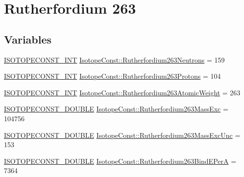 \hypertarget{group___isotope_const-_rutherfordium-_rf263}{}\section{Rutherfordium 263}
\label{group___isotope_const-_rutherfordium-_rf263}
\subsection*{Variables}
\begin{DoxyCompactItemize}
\item 
\mbox{\hyperlink{group___isotope_const-_macros_ga5f18360b3e99483a35c32d789e62621c}{I\+S\+O\+T\+O\+P\+E\+C\+O\+N\+S\+T\+\_\+\+I\+NT}} \mbox{\hyperlink{group___isotope_const-_rutherfordium-_rf263_ga49b1b76a16f8b190397a4f9443e6d981}{Isotope\+Const\+::\+Rutherfordium263\+Neutrons}} = 159
\item 
\mbox{\hyperlink{group___isotope_const-_macros_ga5f18360b3e99483a35c32d789e62621c}{I\+S\+O\+T\+O\+P\+E\+C\+O\+N\+S\+T\+\_\+\+I\+NT}} \mbox{\hyperlink{group___isotope_const-_rutherfordium-_rf263_gaeb50ead4712e514768cff008aa7c628b}{Isotope\+Const\+::\+Rutherfordium263\+Protons}} = 104
\item 
\mbox{\hyperlink{group___isotope_const-_macros_ga5f18360b3e99483a35c32d789e62621c}{I\+S\+O\+T\+O\+P\+E\+C\+O\+N\+S\+T\+\_\+\+I\+NT}} \mbox{\hyperlink{group___isotope_const-_rutherfordium-_rf263_gae3bc559599657714de6118653ead2b63}{Isotope\+Const\+::\+Rutherfordium263\+Atomic\+Weight}} = 263
\item 
\mbox{\hyperlink{group___isotope_const-_macros_ga8f45a7272ce02c0b4c65c44636ed719a}{I\+S\+O\+T\+O\+P\+E\+C\+O\+N\+S\+T\+\_\+\+D\+O\+U\+B\+LE}} \mbox{\hyperlink{group___isotope_const-_rutherfordium-_rf263_ga4adbe609a2bbd912a152fd78ff68497e}{Isotope\+Const\+::\+Rutherfordium263\+Mass\+Exc}} = 104756
\item 
\mbox{\hyperlink{group___isotope_const-_macros_ga8f45a7272ce02c0b4c65c44636ed719a}{I\+S\+O\+T\+O\+P\+E\+C\+O\+N\+S\+T\+\_\+\+D\+O\+U\+B\+LE}} \mbox{\hyperlink{group___isotope_const-_rutherfordium-_rf263_gae8f557850ffc46bab35ba76247b3f497}{Isotope\+Const\+::\+Rutherfordium263\+Mass\+Exc\+Unc}} = 153
\item 
\mbox{\hyperlink{group___isotope_const-_macros_ga8f45a7272ce02c0b4c65c44636ed719a}{I\+S\+O\+T\+O\+P\+E\+C\+O\+N\+S\+T\+\_\+\+D\+O\+U\+B\+LE}} \mbox{\hyperlink{group___isotope_const-_rutherfordium-_rf263_gaf1a19caad9bb68ca7e47779b172a573d}{Isotope\+Const\+::\+Rutherfordium263\+Bind\+E\+PerA}} = 7364

\end{DoxyCompactItemize}
